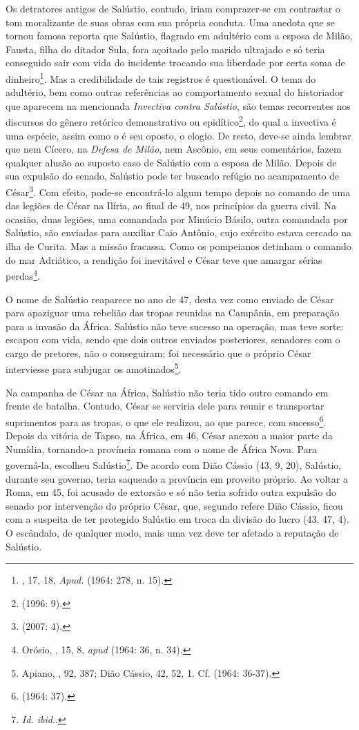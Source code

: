 Os detratores antigos de Salústio, contudo, iriam comprazer-se em contrastar o
tom moralizante de suas obras com sua própria conduta. Uma anedota que se
tornou famosa reporta que Salústio, flagrado em adultério com a esposa de
Milão, Fausta, filha do ditador Sula, fora açoitado pelo marido ultrajado e só
teria conseguido sair com vida do incidente trocando sua liberdade por certa
soma de dinheiro\footnote{  ,  17, 18, \emph{Apud.}  (1964: 
278, n. 15).}.  Mas a credibilidade de tais registros é questionável. O tema do
adultério, bem como outras referências ao comportamento sexual do historiador
que aparecem na mencionada \emph{Invectiva contra Salústio}, são temas
recorrentes nos discursos do gênero retórico demonstrativo ou
epidítico\footnote{ (1996: 9).}, do qual a invectiva é uma espécie,
assim como o é seu oposto, o elogio. De resto, deve-se ainda lembrar que nem
Cícero, na \emph{Defesa de Milão}, nem Ascônio, em seus comentários, fazem
qualquer alusão ao suposto caso de Salústio com a esposa de Milão.  Depois de
sua expulsão do senado, Salústio pode ter buscado refúgio no acampamento de
César\footnote{ (2007: 4).}. Com efeito, pode-se encontrá-lo algum
tempo depois no comando de uma das legiões de César na Ilíria, ao final de 49,
nos princípios da guerra civil. Na ocasião, duas legiões, uma comandada por
Minúcio Básilo, outra comandada por Salústio, são enviadas para auxiliar Caio
Antônio, cujo exército estava cercado na ilha de Curita. Mas a missão fracassa.
Como os pompeianos detinham o comando do mar Adriático, a rendição foi
inevitável e César teve que amargar sérias perdas\footnote{Orósio, , 15, 8,
\emph{apud}  (1964: 36, n. 34).}.

O nome de Salústio reaparece no ano de 47, desta vez como enviado de César para
apaziguar uma rebelião das tropas reunidas na Campânia, em preparação para a
invasão da África. Salústio não teve sucesso na operação, mas teve sorte:
escapou com vida, sendo que dois outros enviados posteriores, senadores com o
cargo de pretores, não o conseguiram; foi necessário que o próprio César
interviesse para subjugar os amotinados\footnote{Apiano, \emph{} , 92,
387; Dião Cássio, 42, 52, 1. Cf.  (1964: 36-37).}. 

Na campanha de César na África, Salústio não teria tido outro comando em frente
de batalha. Contudo, César se serviria dele para reunir e transportar
suprimentos para as tropas, o que ele realizou, ao que parece, com
sucesso\footnote{ (1964: 37).}. Depois da vitória de Tapso, na África,
em 46, César anexou a maior parte da Numídia, tornando-a província romana com o
nome de África Nova. Para governá-la, escolheu Salústio\footnote{\emph{ Id.
ibid.}.}. De acordo com Dião Cássio (43, 9, 20),  Salústio, durante seu
governo, teria saqueado a província em proveito próprio. Ao voltar a Roma, em
45, foi acusado de extorsão e só não teria sofrido outra expulsão do senado por
intervenção do próprio César, que, segundo refere Dião Cássio, ficou com a
suspeita de ter protegido Salústio em troca da divisão do lucro (43, 47, 4). O
escândalo, de qualquer modo, mais uma vez deve ter afetado a reputação de
Salústio.

